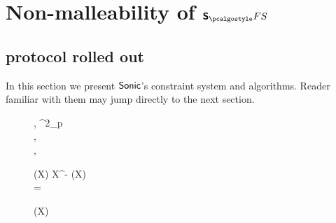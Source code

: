 

\section{Non-malleability of $\sonicprotfs$}
\label{sec:sonic}
\subsection{\sonic{} protocol rolled out}
In this section we present ${\textnormal{\textsf{Sonic}}}$'s constraint system and algorithms. Reader
familiar with them may jump directly to the next section.

 \begin{figure}[h!]
 \centering
 	\begin{pcvstack}
 		\begin{pchstack}
 			\procedure{$\kgen(\secparam, \maxdeg)$} {
 				\alpha, \chi \sample \FF^2_p \\ [\myskip]
 				\pcreturn {},\\
         \pcind {}, \gtar{\alpha}\\
 				\hphantom{\hspace*{5.5cm}}
 		}

 			\pchspace

 			 {
 				(X) \gets \alpha \cdot X^{\dconst - \maxconst} (X) \\ [\myskip]
 				\pcreturn {} = \\ [\myskip]
 				 }
 		\end{pchstack}

 		\begin{pchstack}
 			\procedure{$\open(\srs, z, s, f(X))$}
 			{
 				(X) \gets {}\\ [\myskip]
 				\pcreturn {}\\ [\myskip]
 				\hphantom{\hspace*{5.5cm}}
 			}


\end{pchstack}
\end{pcvstack}
\end{figure}
